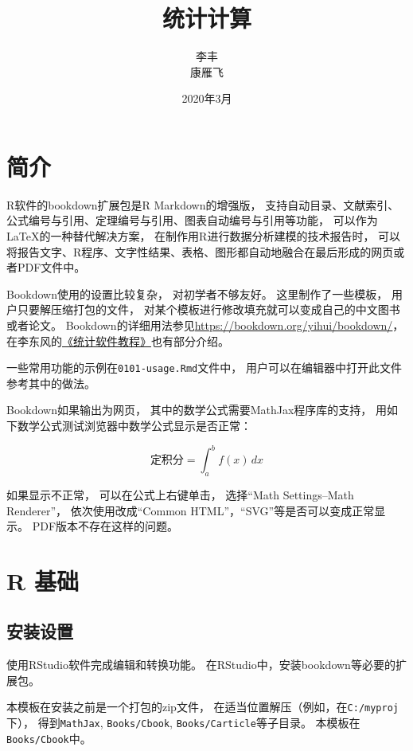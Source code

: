 \documentclass[]{book}
\title{统计计算}
\author{李丰 \\ 康雁飞}
\date{2020年3月}
\theoremstyle{definition}
\theoremstyle{definition}
\theoremstyle{definition}
\theoremstyle{remark}
\begin{document}
\maketitle

{
\setcounter{tocdepth}{1}
\tableofcontents
}
\chapter*{简介}

R软件的bookdown扩展包是R Markdown的增强版，
支持自动目录、文献索引、公式编号与引用、定理编号与引用、图表自动编号与引用等功能，
可以作为LaTeX的一种替代解决方案，
在制作用R进行数据分析建模的技术报告时，
可以将报告文字、R程序、文字性结果、表格、图形都自动地融合在最后形成的网页或者PDF文件中。

Bookdown使用的设置比较复杂， 对初学者不够友好。 这里制作了一些模板，
用户只要解压缩打包的文件，
对某个模板进行修改填充就可以变成自己的中文图书或者论文。
Bookdown的详细用法参见\url{https://bookdown.org/yihui/bookdown/}，
在李东风的\href{http://www.math.pku.edu.cn/teachers/lidf/docs/Rbook/html/_Rbook/index.html}{《统计软件教程》}也有部分介绍。

一些常用功能的示例在\texttt{0101-usage.Rmd}文件中，
用户可以在编辑器中打开此文件参考其中的做法。

Bookdown如果输出为网页， 其中的数学公式需要MathJax程序库的支持，
用如下数学公式测试浏览器中数学公式显示是否正常：

\[
\text{定积分} = \int_a^b f(x) \,dx
\]

如果显示不正常， 可以在公式上右键单击， 选择``Math Settings--Math
Renderer''， 依次使用改成``Common
HTML''，``SVG''等是否可以变成正常显示。 PDF版本不存在这样的问题。

\hypertarget{usage}{%
\chapter{R 基础}\label{usage}}

\hypertarget{usage-ins}{%
\section{安装设置}\label{usage-ins}}

使用RStudio软件完成编辑和转换功能。
在RStudio中，安装bookdown等必要的扩展包。

本模板在安装之前是一个打包的zip文件，
在适当位置解压（例如，在\texttt{C:/myproj}下）， 得到\texttt{MathJax},
\texttt{Books/Cbook}, \texttt{Books/Carticle}等子目录。
本模板在\texttt{Books/Cbook}中。
\end{document}
